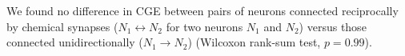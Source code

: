 \documentclass[10pt,letterpaper]{article}
\begin{document}
We found no difference in CGE between pairs of neurons connected reciprocally by chemical synapses ($N_1 \leftrightarrow N_2$ for two neurons $N_1$ and $N_2$) versus those connected unidirectionally ($N_1 \rightarrow N_2$) (Wilcoxon rank-sum test, $p = 0.99$).
\end{document}
